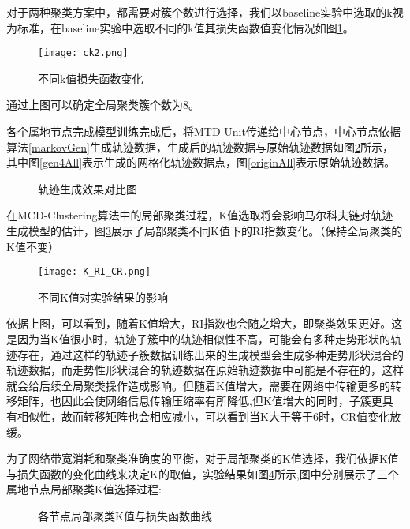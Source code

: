 对于两种聚类方案中，都需要对簇个数进行选择，我们以baseline实验中选取的k视为标准，在baseline实验中选取不同的k值其损失函数值变化情况如图\ref{differentK}。
\begin{figure}[H]
	\texttt{[image: ck2.png]}
	\caption{不同k值损失函数变化}
	\label{differentK}
\end{figure}

通过上图可以确定全局聚类簇个数为8。

各个属地节点完成模型训练完成后，将MTD-Unit传递给中心节点，中心节点依据算法\ref{markovGen}生成轨迹数据，生成后的轨迹数据与原始轨迹数据如图\ref{ch4GenAndOrigin}所示，其中图\ref{gen4All}表示生成的网格化轨迹数据点，图\ref{originAll}表示原始轨迹数据。
\begin{figure}[H]
\caption{轨迹生成效果对比图}
\label{ch4GenAndOrigin}
\end{figure}


在MCD-Clustering算法中的局部聚类过程，K值选取将会影响马尔科夫链对轨迹生成模型的估计，图\ref{kricr}展示了局部聚类不同K值下的RI指数变化。（保持全局聚类的K值不变）
\begin{figure}[H]
	\texttt{[image: K\_RI\_CR.png]}
	\caption{不同K值对实验结果的影响}
	\label{kricr}
\end{figure}

依据上图，可以看到，随着K值增大，RI指数也会随之增大，即聚类效果更好。这是因为当K值很小时，轨迹子簇中的轨迹相似性不高，可能会有多种走势形状的轨迹存在，通过这样的轨迹子簇数据训练出来的生成模型会生成多种走势形状混合的轨迹数据，而走势性形状混合的轨迹数据在原始轨迹数据中可能是不存在的，这样就会给后续全局聚类操作造成影响。但随着K值增大，需要在网络中传输更多的转移矩阵，也因此会使网络信息传输压缩率有所降低,但K值增大的同时，子簇更具有相似性，故而转移矩阵也会相应减小，可以看到当K大于等于6时，CR值变化放缓。

为了网络带宽消耗和聚类准确度的平衡，对于局部聚类的K值选择，我们依据K值与损失函数的变化曲线来决定K的取值，实验结果如图\ref{ch4nodeck}所示,图中分别展示了三个属地节点局部聚类K值选择过程:
\begin{figure}[H]
\caption{各节点局部聚类K值与损失函数曲线}
\label{ch4nodeck}
\end{figure}

